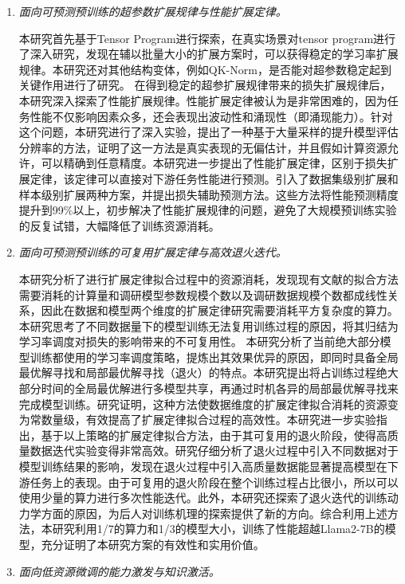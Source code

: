 \begin{enumerate}

\item \textit{面向可预测预训练的超参数扩展规律与性能扩展定律。} 

本研究首先基于Tensor Program进行探索，在真实场景对tensor program进行了深入研究，发现在辅以批量大小的扩展方案时，可以获得稳定的学习率扩展规律。本研究还对其他结构变体，例如QK-Norm，是否能对超参数稳定起到关键作用进行了研究。 在得到稳定的超参扩展规律带来的损失扩展规律后，本研究深入探索了性能扩展规律。性能扩展定律被认为是非常困难的，因为任务性能不仅影响因素众多，还会表现出波动性和涌现性（即涌现能力）。针对这个问题，本研究进行了深入实验，提出了一种基于大量采样的提升模型评估分辨率的方法，证明了这一方法是真实表现的无偏估计，并且假如计算资源允许，可以精确到任意精度。本研究进一步提出了性能扩展定律，区别于损失扩展定律，该定律可以直接对下游任务性能进行预测。引入了数据集级别扩展和样本级别扩展两种方案，并提出损失辅助预测方法。这些方法将性能预测精度提升到99\%以上，初步解决了性能扩展规律的问题，避免了大规模预训练实验的反复试错，大幅降低了训练资源消耗。

\item \textit{面向可预测预训练的可复用扩展定律与高效退火迭代。} 

本研究分析了进行扩展定律拟合过程中的资源消耗，发现现有文献的拟合方法需要消耗的计算量和调研模型参数规模个数以及调研数据规模个数都成线性关系，因此在数据和模型两个维度的扩展定律研究需要消耗平方复杂度的算力。本研究思考了不同数据量下的模型训练无法复用训练过程的原因，将其归结为学习率调度对损失的影响带来的不可复用性。 本研究分析了当前绝大部分模型训练都使用的学习率调度策略，提炼出其效果优异的原因，即同时具备全局最优解寻找和局部最优解寻找（退火）的特点。本研究提出将占训练过程绝大部分时间的全局最优解进行多模型共享，再通过时机各异的局部最优解寻找来完成模型训练。研究证明，这种方法使数据维度的扩展定律拟合消耗的资源变为常数量级，有效提高了扩展定律拟合过程的高效性。本研究进一步实验指出，基于以上策略的扩展定律拟合方法，由于其可复用的退火阶段，使得高质量数据迭代实验变得非常高效。研究仔细分析了退火过程中引入不同数据对于模型训练结果的影响，发现在退火过程中引入高质量数据能显著提高模型在下游任务上的表现。由于可复用的退火阶段在整个训练过程占比很小，所以可以使用少量的算力进行多次性能迭代。此外，本研究还探索了退火迭代的训练动力学方面的原因，为后人对训练机理的探索提供了新的方向。综合利用上述方法，本研究利用1/7的算力和1/3的模型大小，训练了性能超越Llama2-7B的模型，充分证明了本研究方案的有效性和实用价值。

\item \textit{面向低资源微调的能力激发与知识激活。} 


\end{enumerate}
